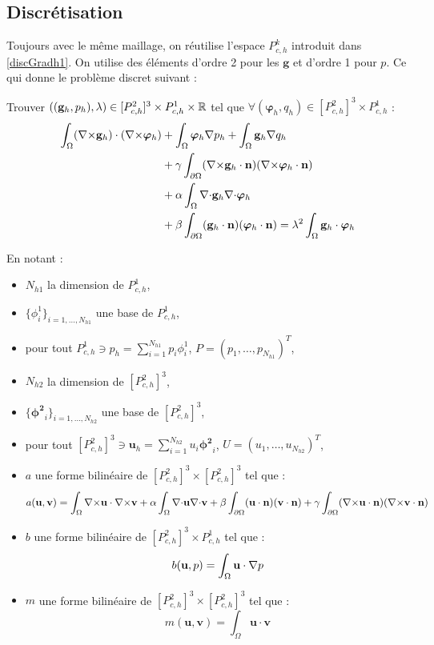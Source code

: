 \subsection{Discrétisation}
Toujours avec le même maillage, on réutilise l'espace $P^k_{c,h}$ introduit dans \ref{discGradh1}. On utilise des éléments d'ordre 2 pour les $\mathbf{g}$ et d'ordre 1 pour $p$. Ce qui donne le problème discret suivant :
\begin{pb}\label{disceigenh1}
Trouver $((\mathbf{g}_h,p_h),\lambda)\in [P^2_{c,h}]^3\times P^1_{c,h} \times {\mathbb{R}}$ tel que $\forall (\bm{\varphi}_h,q_h)\in [P^2_{c,h}]^3\times P^1_{c,h}$ :
\begin{align*}
\int_\Omega ({\nabla\times}\mathbf{g}_h)\cdot({\nabla\times}\bm{\varphi}_h) &+ \int_\Omega\bm{\varphi}_h{\nabla} p_h + \int_\Omega \mathbf{g}_h{\nabla} q_h \\
&+ \gamma\int_{\partial\Omega}({\nabla\times}\mathbf{g}_h\cdot\mathbf{n})({\nabla\times}\bm{\varphi}_h\cdot\mathbf{n})\\
& + \alpha\int_\Omega {\nabla\cdot}\mathbf{g}_h{\nabla\cdot}\bm{\varphi}_h \\
&+ \beta\int_{\partial\Omega}(\mathbf{g}_h\cdot\mathbf{n})(\bm{\varphi}_h\cdot\mathbf{n})  = \lambda^2\int_\Omega \mathbf{g}_h\cdot\bm{\varphi}_h
\end{align*} \end{pb}

En notant :
\begin{itemize}
\item $N_{h1}$ la dimension de $P^1_{c,h}$,
\item $\{\phi^1_i\}_{i=1,\dots,N_{h1}}$ une base de $P^1_{c,h}$,
\item pour tout $P^1_{c,h}\ni p_h=\sum_{i=1}^{N_{h1}} p_i\phi^1_i$, $P=(p_1,\dots,p_{N_{h1}})^T$,
\item $N_{h2}$ la dimension de $[P^2_{c,h}]^3$,
\item $\{\bm{\phi^2}_i\}_{i=1,\dots,N_{h2}}$ une base de $[P^2_{c,h}]^3$,
\item pour tout $[P^2_{c,h}]^3\ni \mathbf{u}_h=\sum_{i=1}^{N_{h2}} u_i\bm{\phi^2}_i$, $U=(u_1,\dots,u_{N_{h2}})^T$,
\item $a$ une forme bilinéaire de $[P^2_{c,h}]^3\times [P^2_{c,h}]^3$ tel que : 
\[ a(\mathbf{u},\mathbf{v})=\int_\Omega {\nabla\times} \mathbf{u}\cdot {\nabla\times} \mathbf{v} + \alpha\int_\Omega {\nabla\cdot}\mathbf{u}{\nabla\cdot}\mathbf{v} + \beta\int_{\partial\Omega}(\mathbf{u}\cdot\mathbf{n})(\mathbf{v}\cdot\mathbf{n}) + \gamma\int_{\partial\Omega}({\nabla\times}\mathbf{u}\cdot\mathbf{n})({\nabla\times}\mathbf{v}\cdot\mathbf{n}) \]
\item $b$ une forme bilinéaire de $[P^2_{c,h}]^3\times P^1_{c,h}$ tel que : \[ b(\mathbf{u},p) = \int_\Omega \mathbf{u}\cdot{\nabla} p \]
\item $m$ une forme bilinéaire de $[P^2_{c,h}]^3\times [P^2_{c,h}]^3$ tel que : \[ m(\mathbf{u},\mathbf{v})=\int_\Omega \mathbf{u}\cdot\mathbf{v} \]
\end{itemize}

